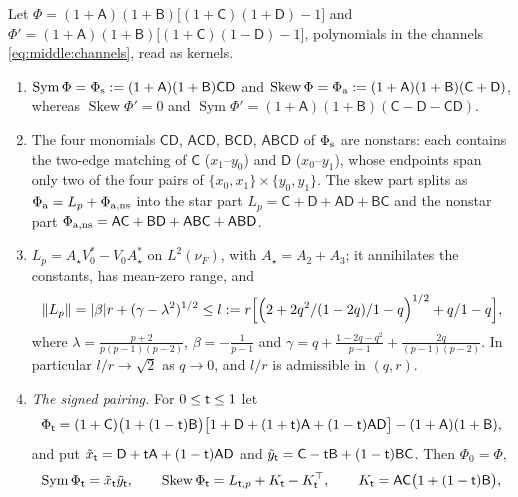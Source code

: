 \begin{lemma}\label{lem:mirror}
Let $\Phi=(1+\mathsf A)(1+\mathsf B)\bigl[(1+\mathsf C)(1+\mathsf D)-1\bigr]$ and
$\Phi'=(1+\mathsf A)(1+\mathsf B)\bigl[(1+\mathsf C)(1-\mathsf D)-1\bigr]$,
polynomials in the channels \eqref{eq:middle:channels}, read as kernels.
\begin{enumerate}[label=(\alph*)]
\item $\operatorname{Sym}\Phi=\Phi_{\rm s}:=(1+\mathsf A)(1+\mathsf B)\mathsf C\mathsf D$ and
 $\operatorname{Skew}\Phi=\Phi_{\rm a}:=(1+\mathsf A)(1+\mathsf B)(\mathsf C+\mathsf D)$,
 whereas $\operatorname{Skew}\Phi'=0$ and
 $\operatorname{Sym}\Phi'=(1+\mathsf A)(1+\mathsf B)(\mathsf C-\mathsf D-\mathsf C\mathsf D)$.
\item The four monomials $\mathsf C\mathsf D$, $\mathsf A\mathsf C\mathsf D$,
 $\mathsf B\mathsf C\mathsf D$, $\mathsf A\mathsf B\mathsf C\mathsf D$ of $\Phi_{\rm s}$
 are nonstars: each contains the two-edge matching of $\mathsf C$ ($x_1$--$y_0$)
 and $\mathsf D$ ($x_0$--$y_1$), whose endpoints span only two of the four pairs
 of $\{x_0,x_1\}\times\{y_0,y_1\}$. The skew part splits as
 $\Phi_{\rm a}=L_p+\Phi_{\rm a,ns}$ into the star part
 $L_p=\mathsf C+\mathsf D+\mathsf A\mathsf D+\mathsf B\mathsf C$ and the nonstar part
 $\Phi_{\rm a,ns}=\mathsf A\mathsf C+\mathsf B\mathsf D+\mathsf A\mathsf B\mathsf C
 +\mathsf A\mathsf B\mathsf D$.
\item $L_p=A_\star V_0^*-V_0A_\star^*$ on $L^2(\nu_F)$, with $A_\star=A_2+A_3$; it
 annihilates the constants, has mean-zero range, and
 \[
  \|L_p\|=|\beta|r+(\gamma-\lambda^2)^{1/2}\le l:=r\Bigl[\Bigl(\frac{2+2q^2/(1-2q)}
  {1-q}\Bigr)^{1/2}+\frac q{1-q}\Bigr],
 \]
 where $\lambda=\frac{p+2}{p(p-1)(p-2)}$, $\beta=-\frac1{p-1}$ and
 $\gamma=q+\frac{1-2q-q^2}{p-1}+\frac{2q}{(p-1)(p-2)}$. In particular $l/r\to\sqrt2$
 as $q\to0$, and $l/r$ is admissible in $(q,r)$.
\item \emph{The signed pairing.} For $0\le\tlaw\le1$ let
 \[
  \Phi_\tlaw=(1+\mathsf C)\bigl(1+(1-\tlaw)\mathsf B\bigr)
  \bigl[1+\mathsf D+(1+\tlaw)\mathsf A+(1-\tlaw)\mathsf A\mathsf D\bigr]
  -(1+\mathsf A)(1+\mathsf B),
 \]
 and put $\tilde x_\tlaw=\mathsf D+\tlaw\mathsf A+(1-\tlaw)\mathsf A\mathsf D$ and
 $\tilde y_\tlaw=\mathsf C-\tlaw\mathsf B+(1-\tlaw)\mathsf B\mathsf C$. Then
 $\Phi_0=\Phi$,
 \[
  \operatorname{Sym}\Phi_\tlaw=\tilde x_\tlaw\tilde y_\tlaw,\qquad
  \operatorname{Skew}\Phi_\tlaw=L_{\tlaw,p}+K_\tlaw-K_\tlaw^\top,\qquad
  K_\tlaw=\mathsf A\mathsf C\bigl(1+(1-\tlaw)\mathsf B\bigr),
 \]

\end{enumerate}
\end{lemma}
